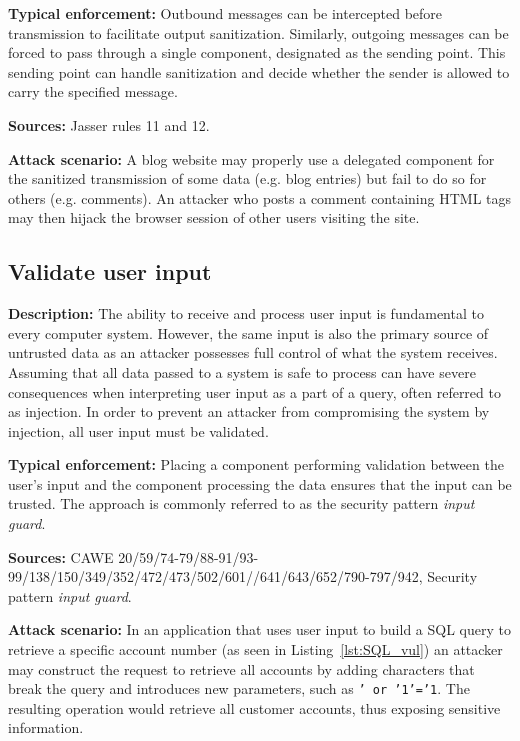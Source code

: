  \textbf{Typical enforcement:} 
 Outbound messages can be intercepted before transmission to facilitate output sanitization. Similarly, outgoing messages can be forced to pass through a single component, designated as the sending point. This sending point can handle sanitization and decide whether the sender is allowed to carry the specified message.
 
 \textbf{Sources:} Jasser rules 11 and 12.
 
 \textbf{Attack scenario:}
 A blog website may properly use a delegated component for the sanitized transmission of some data (e.g. blog entries) but fail to do so for others (e.g. comments). An attacker who posts a comment containing HTML tags may then hijack the browser session of other users visiting the site.

\subsection{Validate user input} 

\textbf{Description:} 
The ability to receive and process user input is fundamental to every computer system. However, the same input is also the primary source of untrusted data as an attacker possesses full control of what the system receives. Assuming that all data passed to a system is safe to process can have severe consequences when interpreting user input as a part of a query, often referred to as injection. In order to prevent an attacker from compromising the system by injection, all user input must be validated.
 
 \textbf{Typical enforcement:} 
 Placing a component performing validation between the user's input and the component processing the data ensures that the input can be trusted. The approach is commonly referred to as the security pattern \textit{input guard}.
 
 \textbf{Sources:} CAWE 20/59/74-79/88-91/93-99/138/150/349/352/472/473/502/601/\newline/641/643/652/790-797/942, Security pattern \textit{input guard}.
 
 \textbf{Attack scenario:}
 In an application that uses user input to build a SQL query to retrieve a specific account number (as seen in Listing~\ref{lst:SQL_vul}) an attacker may construct the request to retrieve all accounts by adding characters that break the query and introduces new parameters, such as \texttt{' or '1'='1}. The resulting operation would retrieve all customer accounts, thus exposing sensitive information.
 
